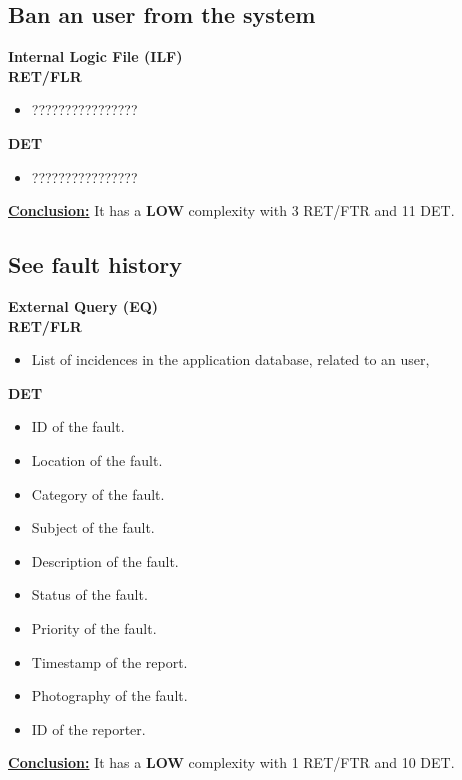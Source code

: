 \subsection{Ban an user from the system}
\textbf{Internal Logic File (ILF)} \\ 
\textbf{RET/FLR}
\begin{itemize}
\item ????????????????
\end{itemize}
\textbf{DET}
\begin{itemize}
\item ????????????????
\end{itemize}
\textbf{\underline{Conclusion:}} It has a \textbf{LOW} complexity with 3 RET/FTR and 11 DET.

\subsection{See fault history}
\textbf{External Query (EQ)} \\ 
\textbf{RET/FLR}
\begin{itemize}
\item List of incidences in the application database, related to an user,
\end{itemize}
\textbf{DET}
\begin{itemize}
\item ID of the fault.
\item Location of the fault.
\item Category of the fault.
\item Subject of the fault.
\item Description of the fault.
\item Status of the fault.
\item Priority of the fault.
\item Timestamp of the report.
\item Photography of the fault.
\item ID of the reporter.
\end{itemize}
\textbf{\underline{Conclusion:}} It has a \textbf{LOW} complexity with 1 RET/FTR and 10 DET.

